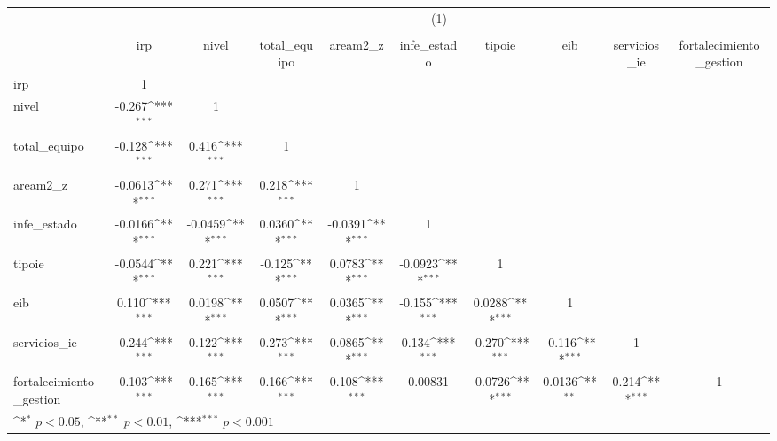{
\def\sym#1{\ifmmode^{#1}\else\(^{#1}\)\fi}
\begin{tabular}{l*{9}{c}}
\hline\hline
          &\multicolumn{9}{c}{(1)}                                                                                                                                                   \\
          &\multicolumn{9}{c}{}                                                                                                                                                      \\
          &      irp         &    nivel         &total\_equipo         & aream2\_z         &infe\_estado         &   tipoie         &      eib         &servicios\_ie         &fortalecimiento\_gestion         \\
\hline
irp       &        1         &                  &                  &                  &                  &                  &                  &                  &                  \\
nivel     &   -0.267\sym{***}&        1         &                  &                  &                  &                  &                  &                  &                  \\
total\_equipo&   -0.128\sym{***}&    0.416\sym{***}&        1         &                  &                  &                  &                  &                  &                  \\
aream2\_z  &  -0.0613\sym{***}&    0.271\sym{***}&    0.218\sym{***}&        1         &                  &                  &                  &                  &                  \\
infe\_estado&  -0.0166\sym{***}&  -0.0459\sym{***}&   0.0360\sym{***}&  -0.0391\sym{***}&        1         &                  &                  &                  &                  \\
tipoie    &  -0.0544\sym{***}&    0.221\sym{***}&   -0.125\sym{***}&   0.0783\sym{***}&  -0.0923\sym{***}&        1         &                  &                  &                  \\
eib       &    0.110\sym{***}&   0.0198\sym{***}&   0.0507\sym{***}&   0.0365\sym{***}&   -0.155\sym{***}&   0.0288\sym{***}&        1         &                  &                  \\
servicios\_ie&   -0.244\sym{***}&    0.122\sym{***}&    0.273\sym{***}&   0.0865\sym{***}&    0.134\sym{***}&   -0.270\sym{***}&   -0.116\sym{***}&        1         &                  \\
fortalecimiento\_gestion&   -0.103\sym{***}&    0.165\sym{***}&    0.166\sym{***}&    0.108\sym{***}&  0.00831         &  -0.0726\sym{***}&   0.0136\sym{**} &    0.214\sym{***}&        1         \\
\hline\hline
\multicolumn{10}{l}{\footnotesize \sym{*} \(p<0.05\), \sym{**} \(p<0.01\), \sym{***} \(p<0.001\)}\\
\end{tabular}
}
